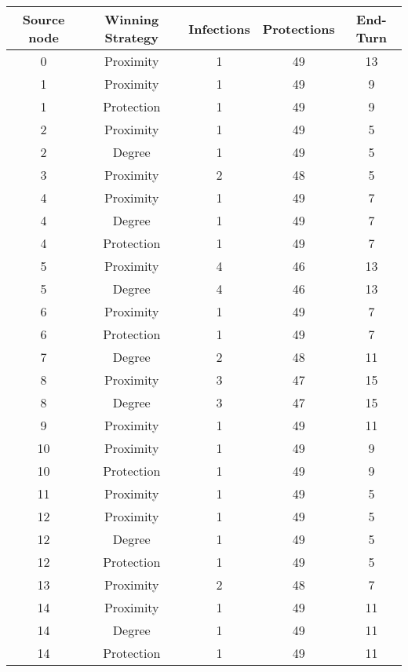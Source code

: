 \documentclass[results.tex]{subfiles}
\begin{document}
\begin{center}
  \begin{tabular}{| c || c | c | c | c |}
    \hline
    {\bfseries Source node} & {\bfseries Winning Strategy} & {\bfseries Infections} & {\bfseries Protections} & {\bfseries End-Turn} \\  %
    \hline\hline
    0 & Proximity & 1 & 49 & 13 \\ 
    \hline
    1 & Proximity & 1 & 49 & 9 \\ 
    \hline
    1 & Protection & 1 & 49 & 9 \\ 
    \hline
    2 & Proximity & 1 & 49 & 5 \\ 
    \hline
    2 & Degree & 1 & 49 & 5 \\ 
    \hline
    3 & Proximity & 2 & 48 & 5 \\ 
    \hline
    4 & Proximity & 1 & 49 & 7 \\ 
    \hline
    4 & Degree & 1 & 49 & 7 \\ 
    \hline
    4 & Protection & 1 & 49 & 7 \\ 
    \hline
    5 & Proximity & 4 & 46 & 13 \\ 
    \hline
    5 & Degree & 4 & 46 & 13 \\ 
    \hline
    6 & Proximity & 1 & 49 & 7 \\ 
    \hline
    6 & Protection & 1 & 49 & 7 \\ 
    \hline
    7 & Degree & 2 & 48 & 11 \\ 
    \hline
    8 & Proximity & 3 & 47 & 15 \\ 
    \hline
    8 & Degree & 3 & 47 & 15 \\ 
    \hline
    9 & Proximity & 1 & 49 & 11 \\ 
    \hline
    10 & Proximity & 1 & 49 & 9 \\ 
    \hline
    10 & Protection & 1 & 49 & 9 \\ 
    \hline
    11 & Proximity & 1 & 49 & 5 \\ 
    \hline
    12 & Proximity & 1 & 49 & 5 \\ 
    \hline
    12 & Degree & 1 & 49 & 5 \\ 
    \hline
    12 & Protection & 1 & 49 & 5 \\ 
    \hline
    13 & Proximity & 2 & 48 & 7 \\ 
    \hline
    14 & Proximity & 1 & 49 & 11 \\ 
    \hline
    14 & Degree & 1 & 49 & 11 \\ 
    \hline
    14 & Protection & 1 & 49 & 11 \\ 

\end{tabular}
\end{center}
\end{document}

